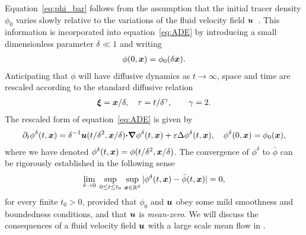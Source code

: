 \documentclass[amsa]{ipart}
\begin{document}
Equation~\eqref{eq:phi_bar}
follows from the assumption that the
initial tracer density $\phi_0$ varies slowly relative to the variations
of the fluid velocity field 
$\boldsymbol{u}$~\cite{McLaughlin:SIAM_JAM:780,Fannjiang:1997:1033,Majda:Kramer:1999:book}.
This information is incorporated into equation~\eqref{eq:ADE} by
introducing a small dimensionless parameter $\delta\ll1$ and
writing~\cite{McLaughlin:SIAM_JAM:780,Fannjiang:1997:1033,Majda:Kramer:1999:book}      
%
\begin{align}
  \phi(0,\vecx)=\phi_0(\delta\vecx). 
\end{align}
%
Anticipating that $\phi$ will have diffusive dynamics as $t\to\infty$, space and 
time are rescaled according to the standard diffusive relation
%
\begin{align}\label{eq:Fast_Vars}
  \vecxi=\vecx/\delta, \quad
  \tau= t/\delta^\gamma,
  \qquad
  \gamma=2.
\end{align}
%
The rescaled form of equation~\eqref{eq:ADE} is given
by~\cite{Majda:Kramer:1999:book}  
%
\begin{align}\label{eq:ADE_delta}
  \partial_t\phi^\delta(t,\vecx)=\delta^{-1}\vecu(t/\delta^2,\vecx/\delta)\bcdot\bnabla\phi^\delta(t,\vecx)
              +\varepsilon\Delta\phi^\delta(t,\vecx),
              \quad
             \phi^\delta(0,\vecx)=\phi_0(\vecx), 
\end{align}
%
where we have denoted $\phi^\delta(t,\boldsymbol{x})=\phi(t/\delta^2,\boldsymbol{x}/\delta)$.
The convergence of $\phi^\delta$  to $\bar{\phi}$
 can be rigorously established in the following
sense~\cite{Majda:Kramer:1999:book}   
%
\begin{align}\label{eq:Homogenization_Theorem}
  \lim_{\delta\to0}\;\sup_{0\leq t\leq t_0}\,\sup_{\vecx\in\mathbb{R}^d}
  |\phi^\delta(t,\vecx)-\bar{\phi}(t,\vecx)| =0,
\end{align}
%
for every finite $t_0>0$, provided that $\phi_0$ and $\boldsymbol{u}$ obey some
mild smoothness and boundedness conditions, and that $\boldsymbol{u}$ is
\emph{mean-zero}.  We will discuss the consequences of a fluid
velocity field $\boldsymbol{u}$ with a large scale mean flow in
. 
\end{document}
